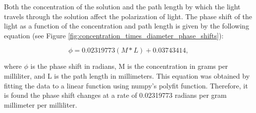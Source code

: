 
Both the concentration of the solution and the path length by which the light travels through the solution affect the polarization of light. The phase shift of the light as a function of the concentration and path length is given by the following equation (see Figure \ref{fig:concentration_times_diameter_phase_shifts}):

\begin{equation}
\phi = 0.02319773(M*L) + 0.03743414,
\end{equation}

where $\phi$ is the phase shift in radians, M is the concentration in grams per milliliter, and L is the path length in millimeters. This equation was obtained by fitting the data to a linear function using numpy's polyfit function. Therefore, it is found the phase shift changes at a rate of 0.02319773 radians per gram millimeter per milliliter.
